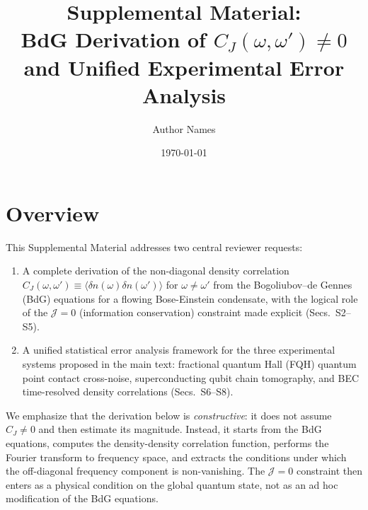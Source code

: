 \documentclass[prd,aps,showpacs,superscriptaddress,twocolumn]{revtex4-2}
\begin{document}
\title{Supplemental Material:\\
BdG Derivation of $C_J(\omega,\omega') \neq 0$\\
and Unified Experimental Error Analysis}

\author{Author Names}

\date{\today}

\maketitle

\setcounter{equation}{0}
\setcounter{figure}{0}
\setcounter{table}{0}
\renewcommand{\theequation}{S\arabic{equation}}
\renewcommand{\thefigure}{S\arabic{figure}}
\renewcommand{\thetable}{S\arabic{table}}

\section{Overview}

This Supplemental Material addresses two central reviewer requests:

\begin{enumerate}
    \item[\textbf{M1+M2.}] A complete derivation of the non-diagonal density correlation $C_J(\omega,\omega') \equiv \langle \delta n(\omega) \delta n(\omega') \rangle$ for $\omega \neq \omega'$ from the Bogoliubov--de Gennes (BdG) equations for a flowing Bose-Einstein condensate, with the logical role of the $\mathcal{J}=0$ (information conservation) constraint made explicit (Secs.~S2--S5).
    \item[\textbf{M4.}] A unified statistical error analysis framework for the three experimental systems proposed in the main text: fractional quantum Hall (FQH) quantum point contact cross-noise, superconducting qubit chain tomography, and BEC time-resolved density correlations (Secs.~S6--S8).
\end{enumerate}

We emphasize that the derivation below is \emph{constructive}: it does not assume $C_J \neq 0$ and then estimate its magnitude. Instead, it starts from the BdG equations, computes the density-density correlation function, performs the Fourier transform to frequency space, and extracts the conditions under which the off-diagonal frequency component is non-vanishing. The $\mathcal{J}=0$ constraint then enters as a physical condition on the global quantum state, not as an ad hoc modification of the BdG equations.
\end{document}
